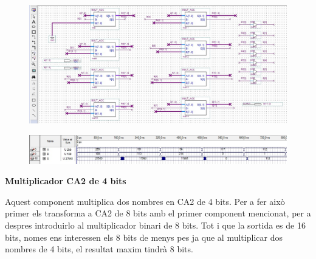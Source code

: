 \documentclass[12pt, a4papre]{article}
\begin{document}
	\begin{center}
	\begin{figure}[H]
		\begin{center}
		\includegraphics[width=150mm]{multbin8bits.jpeg}
		\end{center}
	\end{figure}
	
	\end{center}
	
	\begin{center}
	\begin{figure}[H]
		\begin{center}
		\includegraphics[width=150mm]{multbin8bitssimul.jpeg}
		\end{center}
	\end{figure}
	
	\end{center}
	
	
	
	
	\textbf{\large{Multiplicador CA2 de 4 bits}}
	
	Aquest component multiplica dos nombres en CA2 de 4 bits. Per a fer això primer els transforma a CA2 de 8 bits amb el primer component mencionat, per a despres introduirlo al multiplicador binari de 8 bits. Tot i que la sortida es de 16 bits, nomes ens interessen els 8 bits de menys pes ja que al multiplicar dos nombres de 4 bits, el resultat maxim tindrà 8 bits.
	
\end{document}
